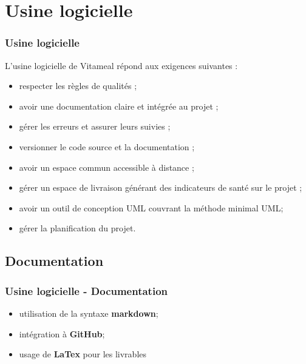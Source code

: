 \documentclass{beamer}
\begin{document}
\section{Usine logicielle}
\begin{frame}[label=usineLogicielle]
\frametitle{Usine logicielle}
L'usine logicielle de Vitameal répond aux exigences suivantes :
\begin{itemize}
\item respecter les règles de qualités ;
\item avoir une documentation claire et intégrée au projet ;
\item gérer les erreurs et assurer leurs suivies ;
\item versionner le code source et la documentation ;
\item avoir un espace commun accessible à distance ;
\item gérer un espace de livraison générant des indicateurs de santé sur le projet ;
\item avoir un outil de conception UML couvrant la méthode minimal UML;
\item gérer la planification du projet.
\end{itemize}
\end{frame}

\subsection{Documentation}
\begin{frame}[label=documentation]
  \frametitle{Usine logicielle - Documentation}
  \begin{itemize}
  \item utilisation de la syntaxe \textbf{markdown};
  \item intégration à \textbf{GitHub};
  \item usage de \textbf{LaTex} pour les livrables
\end{itemize}
\end{frame}
\end{document}
